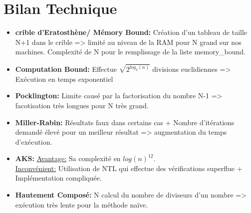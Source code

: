 	\section{Bilan Technique}
		\begin{frame}
			\begin{itemize}
			\item \textbf{crible d'Eratosthène/ Mémory Bound:} Création d'un tableau de taille N+1 dans le crible => limité au niveau de la RAM pour N grand sur nos machines. Complexité de N pour le remplissage de la liste memory\_bound. \\
			\vspace{1em}			
			\item \textbf{Computation Bound:} Effectue $\sqrt{2^{log_2(n)}}$ divisions euclidiennes => Exécution en temps exponentiel\\
			\vspace{1em}
			\item \textbf{Pocklington:} Limite causé par la factorisation du nombre N-1 => facotisation très longues pour N très grand.\\
			\vspace{1em}
			
			\end{itemize}	
			\end{frame}
			
			\begin{frame}
			\begin{itemize}
			\item \textbf{Miller-Rabin:} Résultats faux dans certains cas + Nombre d'itérations demandé élevé pour un meilleur résultat => augmentation du temps d'exécution.  \\
			\vspace{1em}
			\item \textbf{AKS:} \underline{Avantage:} Sa complexité en $log(n)^{12}$.\\
						\underline{Inconvénient:} Utilisation de NTL qui effectue des vérifications superflue + Implémentation compliquée.\\
			\vspace{1em}
			\item \textbf{Hautement Composé:} N calcul du nombre de diviseurs d'un nombre => exécution très lente pour la méthode naïve.\\
			\end{itemize}			
		\end{frame}
		
